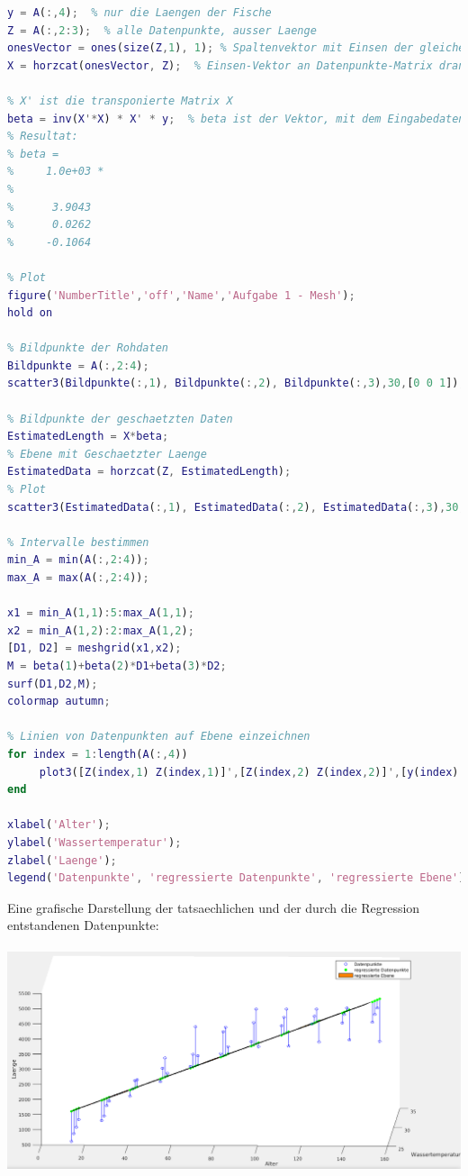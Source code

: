 \documentclass[12pt]{article}
\begin{document}
\begin{lstlisting}[language=Matlab]
y = A(:,4);  % nur die Laengen der Fische
Z = A(:,2:3);  % alle Datenpunkte, ausser Laenge
onesVector = ones(size(Z,1), 1); % Spaltenvektor mit Einsen der gleichen Laenge wie A
X = horzcat(onesVector, Z);  % Einsen-Vektor an Datenpunkte-Matrix drankleben

% X' ist die transponierte Matrix X
beta = inv(X'*X) * X' * y;  % beta ist der Vektor, mit dem Eingabedaten multipliziert werden muessen, damit wir an die Klassen-Labels kommen
% Resultat:
% beta =
%     1.0e+03 *
%  
%      3.9043
%      0.0262
%     -0.1064

% Plot
figure('NumberTitle','off','Name','Aufgabe 1 - Mesh');
hold on

% Bildpunkte der Rohdaten
Bildpunkte = A(:,2:4);
scatter3(Bildpunkte(:,1), Bildpunkte(:,2), Bildpunkte(:,3),30,[0 0 1]);

% Bildpunkte der geschaetzten Daten
EstimatedLength = X*beta;
% Ebene mit Geschaetzter Laenge
EstimatedData = horzcat(Z, EstimatedLength);
% Plot
scatter3(EstimatedData(:,1), EstimatedData(:,2), EstimatedData(:,3),30,[0 1 0], 'filled');

% Intervalle bestimmen
min_A = min(A(:,2:4));
max_A = max(A(:,2:4));

x1 = min_A(1,1):5:max_A(1,1);
x2 = min_A(1,2):2:max_A(1,2);
[D1, D2] = meshgrid(x1,x2);
M = beta(1)+beta(2)*D1+beta(3)*D2;
surf(D1,D2,M);
colormap autumn;

% Linien von Datenpunkten auf Ebene einzeichnen
for index = 1:length(A(:,4))
     plot3([Z(index,1) Z(index,1)]',[Z(index,2) Z(index,2)]',[y(index) EstimatedLength(index)]','-b');
end

xlabel('Alter'); 
ylabel('Wassertemperatur'); 
zlabel('Laenge');
legend('Datenpunkte', 'regressierte Datenpunkte', 'regressierte Ebene')
\end{lstlisting}
Eine grafische Darstellung der tatsaechlichen und der durch die Regression entstandenen Datenpunkte:\\
\\
\includegraphics[width=14cm]{aufg1_ebene01.png}\\
\end{document}
